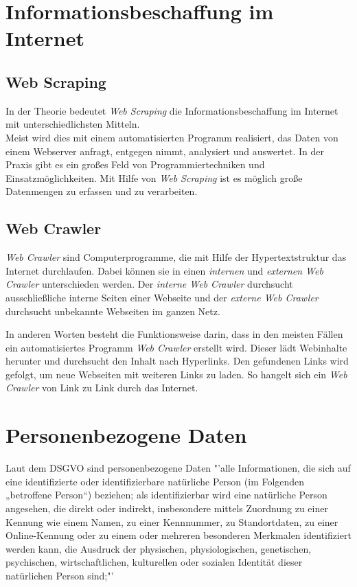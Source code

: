 \section{Informationsbeschaffung im Internet}
	\subsection{Web Scraping}
		In der Theorie bedeutet \textit{Web Scraping} die Informationsbeschaffung im Internet mit unterschiedlichsten Mitteln. \cite{WebScraping}\\		
		Meist wird dies mit einem automatisierten Programm realisiert, das Daten von einem Webserver anfragt, entgegen nimmt, analysiert und auswertet. 
		In der Praxis gibt es ein großes Feld von Programmiertechniken und Einsatzmöglichkeiten.
		Mit Hilfe von \textit{Web Scraping} ist es möglich große Datenmengen zu erfassen und zu verarbeiten.\cite{WebScraping}

	\subsection{Web Crawler}
	\textit{Web Crawler} sind Computerprogramme, die mit Hilfe der Hypertextstruktur das Internet durchlaufen. Dabei können sie in einen \textit{internen} und \textit{externen Web Crawler} unterschieden werden. Der \textit{interne Web Crawler} durchsucht ausschließliche interne Seiten einer Webseite und der \textit{externe Web Crawler} durchsucht unbekannte Webseiten im ganzen Netz. \cite{sharma2012study}
	
	In anderen Worten besteht die Funktionsweise darin, dass in den meisten Fällen ein automatisiertes Programm \textit{Web Crawler} erstellt wird. Dieser lädt Webinhalte herunter und durchsucht den Inhalt nach Hyperlinks. Den gefundenen Links wird gefolgt, um neue Webseiten mit weiteren Links zu laden. So hangelt sich ein \textit{Web Crawler} von Link zu Link durch das Internet.\cite{WebScraping}


\section{Personenbezogene Daten}
	Laut dem DSGVO sind personenbezogene Daten "'alle Informationen, die sich auf eine identifizierte oder identifizierbare natürliche Person (im Folgenden „betroffene Person“) beziehen; als identifizierbar wird eine natürliche Person angesehen, die direkt oder indirekt, insbesondere mittels Zuordnung zu einer Kennung wie einem Namen, zu einer Kennnummer, zu Standortdaten, zu einer Online-Kennung oder zu einem oder mehreren besonderen Merkmalen identifiziert werden kann, die Ausdruck der physischen, physiologischen, genetischen, psychischen, wirtschaftlichen, kulturellen oder sozialen Identität dieser natürlichen Person sind;"'\cite{personenbezogeneDaten}
